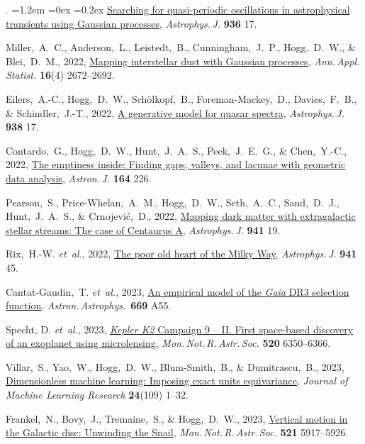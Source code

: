 \documentclass[10pt,letterpaper]{article}
\newcommand{\foreign}[1]{\textsl{#1}}
\newcommand{\etal}{\foreign{et~al.}}
\newcommand{\project}[1]{\textsl{#1}}
\newcommand{\doi}[2]{\href{http://dx.doi.org/#1}{{#2}}}
\newcommand{\deemph}[1]{\textcolor{grey}{\footnotesize{#1}}}
\newcommand{\pubnumber}[1]{\deemph{{#1}.}}
\newcounter{refpubnum}
\newcommand{\hogglist}{%
    \rightmargin=0in
    \leftmargin=1.2em
    \topsep=0ex
    \partopsep=0pt
    \itemsep=0.2ex
    \parsep=0pt
    \itemindent=-1.0\leftmargin
    \listparindent=0.0\leftmargin
    \settowidth{\labelsep}{~}
    \usecounter{refpubnum}
  }
\begin{document}
\begin{list}{\pubnumber{\therefpubnum}}{\hogglist}
  \doi{10.3847/1538-4357/ac7959}{Searching for quasi-periodic oscillations in astrophysical transients using Gaussian processes},
  \textit{Astrophys.\,J.} \textbf{936} 17.
\item
  Miller,~A.~C., Anderson,~L., Leistedt,~B., Cunningham,~J.~P., Hogg,~D.~W., \& Blei,~D.~M., 2022,
  \doi{10.1214/22-AOAS1608}{Mapping interstellar dust with Gaussian processes},
  \textit{Ann.\,Appl.\,Statist.} \textbf{16}(4) 2672--2692.
\item
  Eilers,~A.-C., Hogg,~D.~W., Sch\"olkopf,~B., Foreman-Mackey,~D., Davies,~F.~B.,
  \& Schindler,~J.-T., 2022,
  \doi{10.3847/1538-4357/ac8ead}{A generative model for quasar spectra},
  \textit{Astrophys.\,J.} \textbf{938} 17.
\item
  Contardo,~G., Hogg,~D.~W., Hunt,~J.~A.~S., Peek,~J.~E.~G., \& Chen,~Y.-C., 2022,
  \doi{10.3847/1538-3881/ac961e}{The emptiness inside: Finding gaps, valleys, and lacunae with geometric data analysis},
  \textit{Astron.\,J.} \textbf{164} 226.
\item
  Pearson,~S., Price-Whelan,~A.~M., Hogg,~D.~W., Seth,~A.~C., Sand,~D.~J., Hunt,~J.~A.~S.,
  \& Crnojevi\'c,~D., 2022,
  \doi{10.3847/1538-4357/ac9bfb}{Mapping dark matter with extragalactic stellar streams: The case of Centaurus A},
  \textit{Astrophys.\,J.} \textbf{941} 19.
\item
  Rix,~H.-W. \etal, 2022,
  \doi{10.3847/1538-4357/ac9e01}{The poor old heart of the Milky Way},
  \textit{Astrophys.\,J.} \textbf{941} 45.
\item
  Cantat-Gaudin,~T. \etal, 2023,
  \doi{10.1051/0004-6361/202244784}{An empirical model of the \project{Gaia} DR3 selection function},
  \textit{Astron.\,Astrophys.}\ \textbf{669} A55.
\item
  Specht, D. \etal, 2023,
  \doi{10.1093/mnras/stad212}{\project{Kepler K2} Campaign 9 -- II. First space-based discovery of an exoplanet using microlensing},
  \textit{Mon.\,Not.\,R.\,Astr.\,Soc.} \textbf{520} 6350--6366.
\item
  Villar,~S., Yao,~W., Hogg,~D.~W., Blum-Smith,~B., \& Dumitrascu,~B., 2023,
  \href{https://jmlr.org/papers/v24/22-0680.html}{Dimensionless machine learning: Imposing exact units equivariance},
  \textit{Journal of Machine Learning Research} \textbf{24}(109) 1--32.
\item
  Frankel,~N., Bovy,~J., Tremaine,~S., \& Hogg,~D.~W., 2023,
  \doi{10.1093/mnras/stad908}{Vertical motion in the Galactic disc: Unwinding the Snail},
  \textit{Mon.\,Not.\,R.\,Astr.\,Soc.} \textbf{521} 5917--5926.

\end{list}
\end{document}
